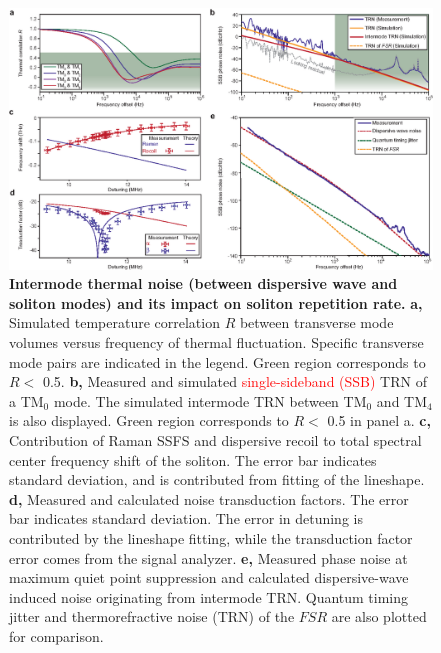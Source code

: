 \documentclass[noshowpacs,amsmath,
twocolumn,
superscriptaddress,
8pt,
aps,prb]{revtex4-2}
\begin{document}
\begin{figure}[t]
\includegraphics[width=\linewidth]{Fig5.eps}
\caption{{\bf Intermode thermal noise (between dispersive wave and soliton modes) and its impact on soliton repetition rate.} {\bf a,} Simulated temperature correlation $R$ between transverse mode volumes versus frequency of thermal fluctuation. Specific transverse mode pairs are indicated in the legend. Green region corresponds to $R<$ 0.5. {\bf b,} Measured and simulated \textcolor{red}{single-sideband (SSB)} TRN of a TM$_0$ mode. The simulated intermode TRN between TM$_0$ and TM$_4$ is also displayed. Green region corresponds to $R<$ 0.5 in panel a. {\bf c,} Contribution of Raman SSFS and dispersive recoil to total spectral center frequency shift of the soliton. The error bar indicates standard deviation, and is contributed from fitting of the lineshape. {\bf d,} Measured and calculated noise transduction factors. The error bar indicates standard deviation. The error in detuning is contributed by the lineshape fitting, while the transduction factor error comes from the signal analyzer. {\bf e,} Measured phase noise at maximum quiet point suppression and calculated dispersive-wave induced noise originating from intermode TRN. Quantum timing jitter and thermorefractive noise (TRN) of the $FSR$ are also plotted for comparison. }
\label{figure5}
\end{figure}
\end{document}
